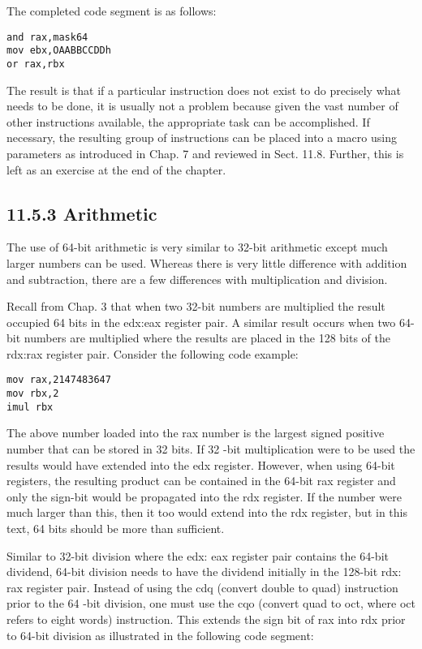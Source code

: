 \documentclass[10pt]{article}
\begin{document}
The completed code segment is as follows:

\begin{verbatim}
and rax,mask64
mov ebx,OAABBCCDDh
or rax,rbx
\end{verbatim}

The result is that if a particular instruction does not exist to do precisely what needs to be done, it is usually not a problem because given the vast number of other instructions available, the appropriate task can be accomplished. If necessary, the resulting group of instructions can be placed into a macro using parameters as introduced in Chap. 7 and reviewed in Sect. 11.8. Further, this is left as an exercise at the end of the chapter.

\subsection*{11.5.3 Arithmetic}
The use of 64-bit arithmetic is very similar to 32-bit arithmetic except much larger numbers can be used. Whereas there is very little difference with addition and subtraction, there are a few differences with multiplication and division.

Recall from Chap. 3 that when two 32-bit numbers are multiplied the result occupied 64 bits in the edx:eax register pair. A similar result occurs when two 64-bit numbers are multiplied where the results are placed in the 128 bits of the rdx:rax register pair. Consider the following code example:

\begin{verbatim}
mov rax,2147483647
mov rbx,2
imul rbx
\end{verbatim}

The above number loaded into the rax number is the largest signed positive number that can be stored in 32 bits. If 32 -bit multiplication were to be used the results would have extended into the edx register. However, when using 64-bit registers, the resulting product can be contained in the 64-bit rax register and only the sign-bit would be propagated into the rdx register. If the number were much larger than this, then it too would extend into the rdx register, but in this text, 64 bits should be more than sufficient.

Similar to 32-bit division where the edx: eax register pair contains the 64-bit dividend, 64-bit division needs to have the dividend initially in the 128-bit rdx:\\
rax register pair. Instead of using the cdq (convert double to quad) instruction prior to the 64 -bit division, one must use the cqo (convert quad to oct, where oct refers to eight words) instruction. This extends the sign bit of rax into rdx prior to 64-bit division as illustrated in the following code segment:
\end{document}

